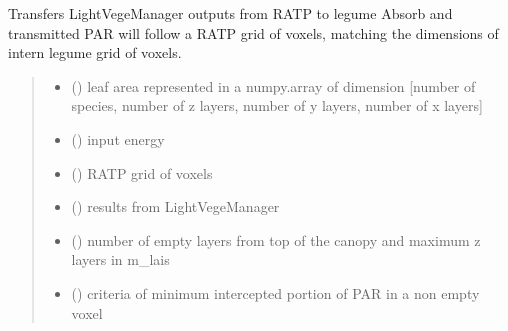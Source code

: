 \documentclass[letterpaper,10pt,english]{sphinxmanual}
\begin{document}
\begin{fulllineitems}
\label{\detokenize{reference:transfer.transfer_ratp_legume}}
\pysigstartsignatures
{}
\pysigstopsignatures
\sphinxAtStartPar
Transfers LightVegeManager outputs from RATP to l\sphinxhyphen{}egume
Absorb and transmitted PAR will follow a RATP grid of voxels, matching the dimensions of intern l\sphinxhyphen{}egume grid of voxels.
\begin{quote}\begin{description}
\begin{itemize}
\item {} 
\sphinxAtStartPar
{} () \textendash{} leaf area represented in a numpy.array of dimension
{[}number of species, number of z layers, number of y layers, number of x layers{]}

\item {} 
\sphinxAtStartPar
{} () \textendash{} input energy

\item {} 
\sphinxAtStartPar
{} () \textendash{} RATP grid of voxels

\item {} 
\sphinxAtStartPar
{} () \textendash{} results from LightVegeManager

\item {} 
\sphinxAtStartPar
{} () \textendash{} number of empty layers from top of the canopy and maximum z layers in m\_lais

\item {} 
\sphinxAtStartPar
{} () \textendash{} criteria of minimum intercepted portion of PAR in a non empty voxel


\end{itemize}
\end{description}
\end{quote}
\end{fulllineitems}
\end{document}
